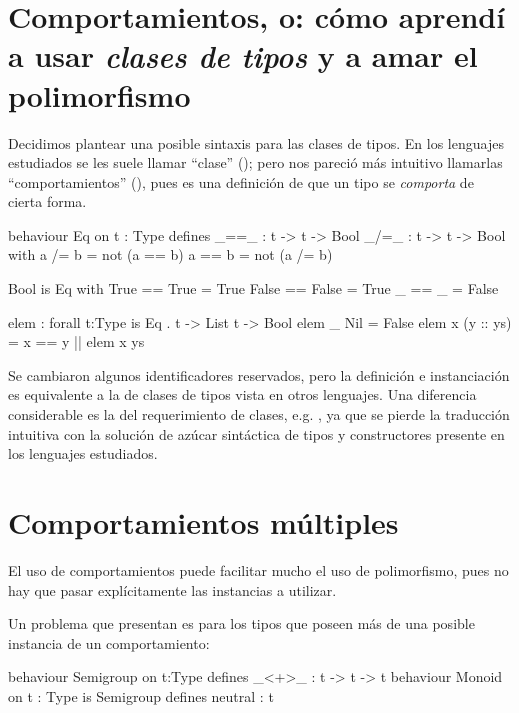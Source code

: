 {\section{Comportamientos, o: cómo aprendí a usar \emph{clases de tipos} y a amar el polimorfismo}

\begin{designfr}
Decidimos plantear una posible sintaxis para las clases de tipos. En los lenguajes estudiados se les suele llamar \enquote{clase} (); pero nos pareció más intuitivo llamarlas \enquote{comportamientos} (), pues es una definición de que un tipo se \emph{comporta} de cierta forma.

\begin{anglercode}
behaviour Eq on t : Type defines
    _==_ : t -> t -> Bool
    _/=_ : t -> t -> Bool
  with
    a /= b = not (a == b)
    a == b = not (a /= b)

Bool is Eq with
    True  == True  = True
    False == False = True
    _     == _     = False

elem : forall t:Type is Eq . t -> List t -> Bool
elem _ Nil = False
elem x (y :: ys) = x == y || elem x ys
\end{anglercode}

Se cambiaron algunos identificadores reservados, pero la definición e instanciación es equivalente a la de clases de tipos vista en otros lenguajes. Una diferencia considerable es la del requerimiento de clases, e.g. , ya que se pierde la traducción intuitiva con la solución de azúcar sintáctica de tipos y constructores presente en los lenguajes estudiados.
\end{designfr}

\section{Comportamientos múltiples}

\begin{designfr}
El uso de comportamientos puede facilitar mucho el uso de polimorfismo, pues no hay que pasar explícitamente las instancias a utilizar.

Un problema que presentan es para los tipos que poseen más de una posible instancia de un comportamiento:

\begin{anglercode}
behaviour Semigroup on t:Type defines
    _<+>_ : t -> t -> t
behaviour Monoid on t : Type is Semigroup defines
    neutral : t


\end{anglercode}
\end{designfr}}
